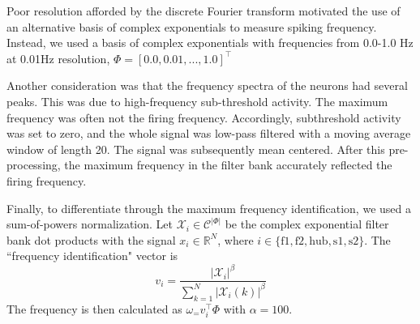 \documentclass[11pt]{article}
\begin{document}
Poor resolution afforded by the discrete Fourier transform motivated the use of an alternative basis of complex exponentials to measure spiking frequency.  Instead, we used a basis of complex exponentials with frequencies from 0.0-1.0 Hz at 0.01Hz resolution, $\Phi = \left[ 0.0, 0.01, ..., 1.0 \right]^\top$

Another consideration was that the frequency spectra of the neurons had several peaks.  This was due to high-frequency sub-threshold activity. The maximum frequency was often not the firing frequency.  Accordingly, subthreshold activity was set to zero, and the whole signal was low-pass filtered with a moving average window of length 20.  The signal was subsequently mean centered.  After this pre-processing, the maximum frequency in the filter bank accurately reflected the firing frequency.

Finally, to differentiate through the maximum frequency identification, we used a sum-of-powers normalization.  Let $\mathcal{X}_i \in \mathcal{C}^{|\Phi|}$ be the complex exponential filter bank dot products with the signal $x_i \in \mathbb{R}^{N}$, where $i \in \{ \text{f1}, \text{f2}, \text{hub}, \text{s1}, \text{s2} \}$.  The ``frequency identification" vector is 
\begin{equation}
v_i = \frac{|\mathcal{X}_i|^\beta}{\sum_{k=1}^N |\mathcal{X}_i(k)|^\beta}
\end{equation}
The frequency is then calculated as $\omega_ = v_i^\top \Phi$ with $\alpha = 100$.
\end{document}
